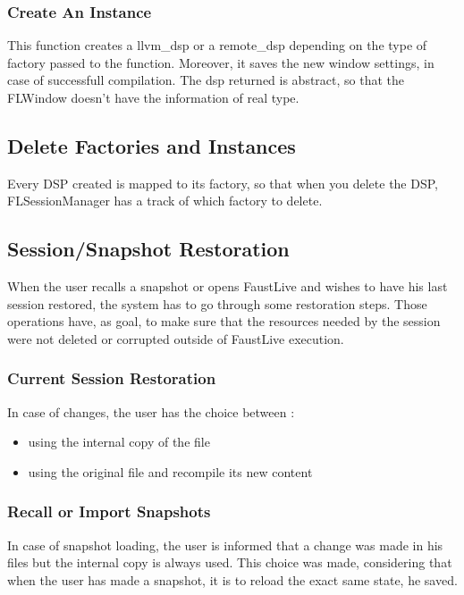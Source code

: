 \documentclass[a4paper]{article}
\begin{document}
\subsubsection{Create An Instance}

This function creates a llvm\_dsp or a remote\_dsp depending on the type of factory passed to the function. Moreover, it saves the new window settings, in case of successfull compilation. The dsp returned is abstract, so that the FLWindow doesn't have the information of real type. 

\subsection{Delete Factories and Instances}

Every DSP created is mapped to its factory, so that when you delete the DSP, FLSessionManager has a track of which factory to delete. 

\subsection{Session/Snapshot Restoration}

When the user recalls a snapshot or opens FaustLive and wishes to have his last session restored, the system has to go through some restoration steps. Those operations have, as goal, to make sure that the resources needed by the session were not deleted or corrupted outside of FaustLive execution. 

\subsubsection{Current Session Restoration}

In case of changes, the user has the choice between : 
\begin{itemize}
\item using the internal copy of the file
\item using the original file and recompile its new content
\end{itemize}

\subsubsection{Recall or Import Snapshots}

In case of snapshot loading, the user is informed that a change was made in his files but the internal copy is always used. This choice was made, considering that when the user has made a snapshot, it is to reload the exact same state, he saved. 
\end{document}
